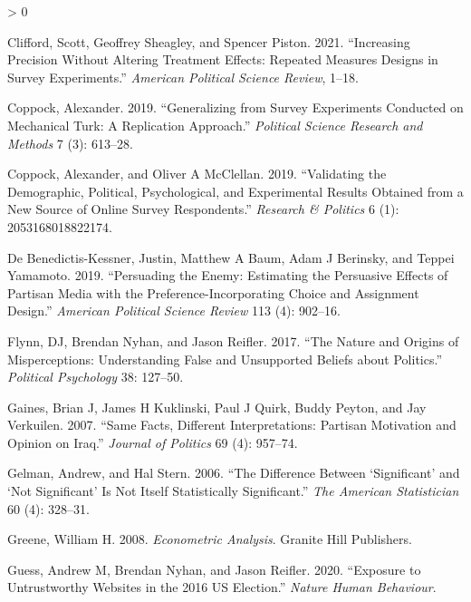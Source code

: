 \documentclass[
  12pt,
]{article}
\newlength{\cslhangindent}
\newenvironment{CSLReferences}[2] %
 {%
  \setlength{\parindent}{0pt}
  \ifodd #1 \everypar{\setlength{\hangindent}{\cslhangindent}}\ignorespaces\fi
  \ifnum #2 > 0
  \setlength{\parskip}{#2\baselineskip}
  \fi
 }%
 {}
\begin{document}
\begin{CSLReferences}{1}{0}
\leavevmode\hypertarget{ref-clifford2021increasing}{}%
Clifford, Scott, Geoffrey Sheagley, and Spencer Piston. 2021.
{``Increasing Precision Without Altering Treatment Effects: Repeated
Measures Designs in Survey Experiments.''} \emph{American Political
Science Review}, 1--18.

\leavevmode\hypertarget{ref-coppock2019generalizing}{}%
Coppock, Alexander. 2019. {``Generalizing from Survey Experiments
Conducted on Mechanical Turk: A Replication Approach.''} \emph{Political
Science Research and Methods} 7 (3): 613--28.

\leavevmode\hypertarget{ref-coppock2019validating}{}%
Coppock, Alexander, and Oliver A McClellan. 2019. {``Validating the
Demographic, Political, Psychological, and Experimental Results Obtained
from a New Source of Online Survey Respondents.''} \emph{Research \&
Politics} 6 (1): 2053168018822174.

\leavevmode\hypertarget{ref-benedictis2019persuading}{}%
De Benedictis-Kessner, Justin, Matthew A Baum, Adam J Berinsky, and
Teppei Yamamoto. 2019. {``Persuading the Enemy: Estimating the
Persuasive Effects of Partisan Media with the Preference-Incorporating
Choice and Assignment Design.''} \emph{American Political Science
Review} 113 (4): 902--16.

\leavevmode\hypertarget{ref-flynn2017nature}{}%
Flynn, DJ, Brendan Nyhan, and Jason Reifler. 2017. {``The Nature and
Origins of Misperceptions: Understanding False and Unsupported Beliefs
about Politics.''} \emph{Political Psychology} 38: 127--50.

\leavevmode\hypertarget{ref-gaines2007same}{}%
Gaines, Brian J, James H Kuklinski, Paul J Quirk, Buddy Peyton, and Jay
Verkuilen. 2007. {``Same Facts, Different Interpretations: Partisan
Motivation and Opinion on Iraq.''} \emph{Journal of Politics} 69 (4):
957--74.

\leavevmode\hypertarget{ref-gelman2006difference}{}%
Gelman, Andrew, and Hal Stern. 2006. {``The Difference Between
{`Significant'} and {`Not Significant'} Is Not Itself Statistically
Significant.''} \emph{The American Statistician} 60 (4): 328--31.

\leavevmode\hypertarget{ref-greene2008econometric}{}%
Greene, William H. 2008. \emph{Econometric Analysis}. Granite Hill
Publishers.

\leavevmode\hypertarget{ref-guess2020exposure}{}%
Guess, Andrew M, Brendan Nyhan, and Jason Reifler. 2020. {``Exposure to
Untrustworthy Websites in the 2016 US Election.''} \emph{Nature Human
Behaviour}.


\end{CSLReferences}
\end{document}
